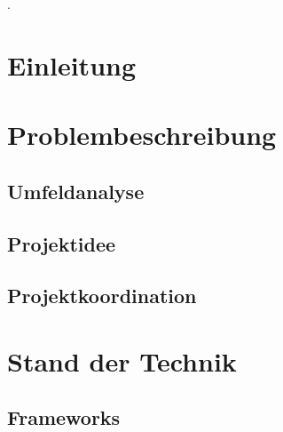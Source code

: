 \documentclass[a4paper,12pt,twoside,openany]{book}
\begin{document}
{\small\color{white}.}
\vspace{-0.7cm}
\renewcommand*\contentsname{Inhalt}
\tableofcontents

\newpage %
\pagestyle{scrheadings}
\ofoot{\pagemark}
\cfoot{}

\section{Einleitung}
\label{sec:einleitung}


\newpage

\section{Problembeschreibung}
\label{sec:problembeschreibung}


\newpage

\subsection{Umfeldanalyse}
\label{subsec:umfeldanalyse}


\newpage

\subsection{Projektidee}
\label{subsec:projektidee}


\subsection{Projektkoordination}
\label{subsec:projektkoordination}


\newpage

\section{Stand der Technik}
\label{sec:standdertechnik}


\subsection{Frameworks}
\label{subsec:frameworks}

\end{document}
